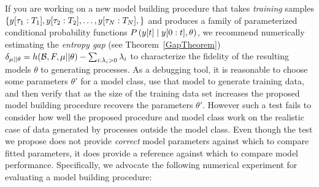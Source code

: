 If you are working on a new model building procedure that takes
\emph{training} samples $\left\{ y[\tau_1:T_1],
  y[\tau_2:T_2], \ldots, y[\tau_N:T_N], \right\}$ and
produces a family of parameterized conditional probability functions
$P \left({y}{[t]}\mid y[0:t],\theta \right)$, we recommend
numerically estimating the \emph{entropy gap} (see
Theorem~\ref{GapTheorem}) $\delta_{\mu||\theta} =
h({\cal{B}},F,\mu||\theta) - \sum_{i : \lambda_i > 0} \lambda_i$ to
characterize the fidelity of the resulting models $\theta$ to
generating processes.  As a debugging tool, it is reasonable to choose
some parameters $\theta'$ for a model class, use that model to
generate training data, and then verify that as the size of the
training data set increases the proposed model building procedure
recovers the parameters $\theta'$.  However such a test fails to
consider how well the proposed procedure and model class work on the
realistic case of data generated by processes outside the model class.
Even though the test we propose does not provide \emph{correct} model
parameters against which to compare fitted parameters, it does provide
a reference against which to compare model performance.  Specifically,
we advocate the following numerical experiment for evaluating a model
building procedure:
